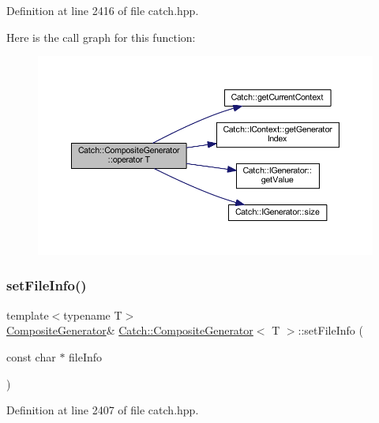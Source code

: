 Definition at line 2416 of file catch.\+hpp.

Here is the call graph for this function\+:\nopagebreak
\begin{figure}[H]
\begin{center}
\leavevmode
\includegraphics[width=350pt]{class_catch_1_1_composite_generator_a83d6c941e2e735b9528e6e832f7b76e7_cgraph}
\end{center}
\end{figure}
\hypertarget{class_catch_1_1_composite_generator_ac3c57cf4ca5472f440bf71e2936bcd4a}{}\label{class_catch_1_1_composite_generator_ac3c57cf4ca5472f440bf71e2936bcd4a} 
\subsubsection{\texorpdfstring{set\+File\+Info()}{setFileInfo()}}
{\footnotesize\ttfamily template$<$typename T$>$ \\
\hyperlink{class_catch_1_1_composite_generator}{Composite\+Generator}\& \hyperlink{class_catch_1_1_composite_generator}{Catch\+::\+Composite\+Generator}$<$ T $>$\+::set\+File\+Info (\begin{DoxyParamCaption}\item[{const char $\ast$}]{file\+Info }\end{DoxyParamCaption})\hspace{0.3cm}{\ttfamily [inline]}}



Definition at line 2407 of file catch.\+hpp.

\hypertarget{class_catch_1_1_composite_generator_a2e03f42df85cdd238aabd77a80b075d5}{}\label{class_catch_1_1_composite_generator_a2e03f42df85cdd238aabd77a80b075d5} 
